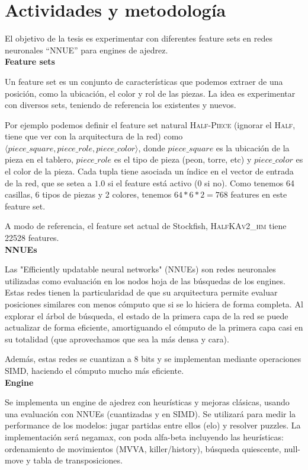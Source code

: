 \section*{Actividades y metodología}

El objetivo de la tesis es experimentar con diferentes feature sets en redes neuronales ``NNUE'' para engines de ajedrez. \\

\textbf{Feature sets}

Un feature set es un conjunto de características que podemos extraer de una posición, como la ubicación, el color y rol de las piezas. La idea es experimentar con diversos sets, teniendo de referencia los existentes y nuevos.

Por ejemplo podemos definir el feature set natural \textsc{Half-Piece} (ignorar el \textsc{Half}, tiene que ver con la arquitectura de la red) como $\langle piece\_square, piece\_role, piece\_color \rangle$, donde $piece\_square$ es la ubicación de la pieza en el tablero, $piece\_role$ es el tipo de pieza (peon, torre, etc) y $piece\_color$ es el color de la pieza. Cada tupla tiene asociada un índice en el vector de entrada de la red, que se setea a $1.0$ si el feature está activo (0 si no). Como tenemos 64 casillas, 6 tipos de piezas y 2 colores, tenemos $64*6*2=768$ features en este feature set.

A modo de referencia, el feature set actual de Stockfish, \textsc{HalfKAv2\_hm} tiene 22528 features. \\

\textbf{NNUEs}

Las "Efficiently updatable neural networks" (NNUEs) son redes neuronales utilizadas como evaluación en los nodos hoja de las búsquedas de los engines. Estas redes tienen la particularidad de que su arquitectura permite evaluar posiciones similares con menos cómputo que si se lo hiciera de forma completa. Al explorar el árbol de búsqueda, el estado de la primera capa de la red se puede actualizar de forma eficiente, amortiguando el cómputo de la primera capa casi en su totalidad (que aprovechamos que sea la más densa y cara).

Además, estas redes se cuantizan a 8 bits y se implementan mediante operaciones SIMD, haciendo el cómputo mucho más eficiente. \\

\textbf{Engine}

Se implementa un engine de ajedrez con heurísticas y mejoras clásicas, usando una evaluación con NNUEs (cuantizadas y en SIMD). Se utilizará para medir la performance de los modelos: jugar partidas entre ellos (elo) y resolver puzzles.
La implementación será negamax, con poda alfa-beta incluyendo las heurísticas: ordenamiento de movimientos (MVVA, killer/history), búsqueda quiescente, null-move y tabla de transposiciones. \\


